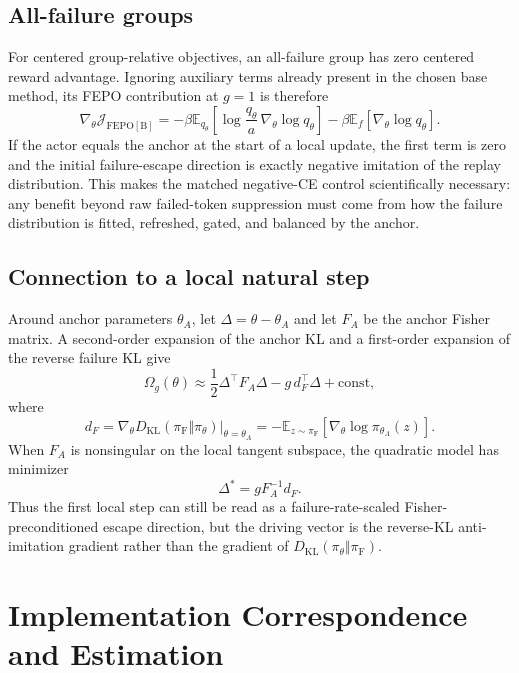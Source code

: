 \documentclass{article}
\newcommand{\pol}{\pi_\theta}
\newcommand{\failpol}{\pi_{\mathrm F}}
\newcommand{\KL}{D_{\mathrm{KL}}}
\newcommand{\E}{\mathbb{E}}
\begin{document}
\subsection{All-failure groups}
For centered group-relative objectives, an all-failure group has zero centered reward advantage. Ignoring auxiliary terms already present in the chosen base method, its FEPO contribution at $g=1$ is therefore
\begin{equation}
\nabla_\theta\mathcal J_{\mathrm{FEPO}[\mathrm B]}
=-\beta\E_{q_\theta}\left[\log\frac{q_\theta}{a}\,\nabla_\theta\log q_\theta\right]
-\beta\E_f\left[\nabla_\theta\log q_\theta\right].
\label{eq:allfailgrad}
\end{equation}
If the actor equals the anchor at the start of a local update, the first term is zero and the initial failure-escape direction is exactly negative imitation of the replay distribution. This makes the matched negative-CE control scientifically necessary: any benefit beyond raw failed-token suppression must come from how the failure distribution is fitted, refreshed, gated, and balanced by the anchor.

\subsection{Connection to a local natural step}
Around anchor parameters $\theta_A$, let $\Delta=\theta-\theta_A$ and let $F_A$ be the anchor Fisher matrix. A second-order expansion of the anchor KL and a first-order expansion of the reverse failure KL give
\begin{equation}
\Omega_g(\theta)\approx \frac12\Delta^\top F_A\Delta-g\,d_F^\top\Delta+\mathrm{const},
\end{equation}
where
\begin{equation}
d_F=\left.\nabla_\theta\KL(\failpol\Vert\pi_\theta)\right|_{\theta=\theta_A}
=-\E_{z\sim\failpol}[\nabla_\theta\log\pi_{\theta_A}(z)].
\end{equation}
When $F_A$ is nonsingular on the local tangent subspace, the quadratic model has minimizer
\begin{equation}
\Delta^*=g F_A^{-1}d_F.
\end{equation}
Thus the first local step can still be read as a failure-rate-scaled Fisher-preconditioned escape direction, but the driving vector is the reverse-KL anti-imitation gradient rather than the gradient of $\KL(\pol\Vert\failpol)$.

\section{Implementation Correspondence and Estimation}
\label{app:implementation}
\end{document}
